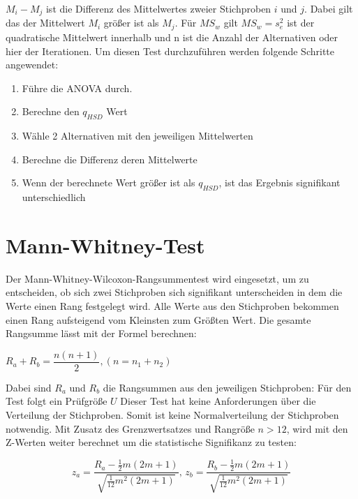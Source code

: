 $M_i - M_j$ ist die Differenz des Mittelwertes zweier Stichproben $i$ und $j$.
Dabei gilt das der Mittelwert $M_i$ größer ist als $M_j$.
Für $MS_w$ gilt $MS_w = s^2_{e}$ ist der quadratische Mittelwert innerhalb und n ist die Anzahl
der Alternativen oder hier der Iterationen.
Um diesen Test durchzuführen werden folgende Schritte angewendet:

\begin{center}
  \begin{enumerate}
    \item Führe die ANOVA durch. 
    \item Berechne den $q_{HSD}$ Wert
    \item Wähle 2 Alternativen mit den jeweiligen Mittelwerten
    \item Berechne die Differenz deren Mittelwerte
    \item Wenn der berechnete Wert größer ist als $q_{HSD}$, ist das Ergebnis signifikant unterschiedlich 
  \end{enumerate}
\end{center}


\section{Mann-Whitney-Test}
Der Mann-Whitney-Wilcoxon-Rangsummentest \cite{statistik_sozialwissenschaften} \cite{u_test}
wird eingesetzt, um zu entscheiden, ob sich zwei
Stichproben sich signifikant unterscheiden in dem die Werte einen Rang festgelegt wird. 
Alle Werte aus den Stichproben bekommen einen Rang aufsteigend vom Kleinsten zum Größten Wert.
Die gesamte Rangsumme lässt mit der Formel berechnen:
\begin{center}
  $R_a + R_b = \dfrac{n(n + 1)}{2}, (n = n_1 + n_2)$
\end{center}  

Dabei sind $R_a$ und $R_b$ die Rangsummen aus den jeweiligen Stichproben:
Für den Test folgt ein Prüfgröße $U$  
Dieser Test
hat keine Anforderungen über die Verteilung der Stichproben.
Somit ist keine Normalverteilung der Stichproben notwendig.
Mit Zusatz des Grenzwertsatzes und Rangröße $n > 12$, wird mit den Z-Werten weiter berechnet um die statistische Signifikanz zu testen:

\begin{center}
  \[
    z_{a} = \frac{R_{a} - \frac{1}{2}m(2m+1)}{\sqrt{\frac{1}{12}m^2(2m+1)}} \text{, }
    z_{b} = \frac{R_{b} - \frac{1}{2}m(2m+1)}{\sqrt{\frac{1}{12}m^2(2m+1)}}
  \]
\end{center}

